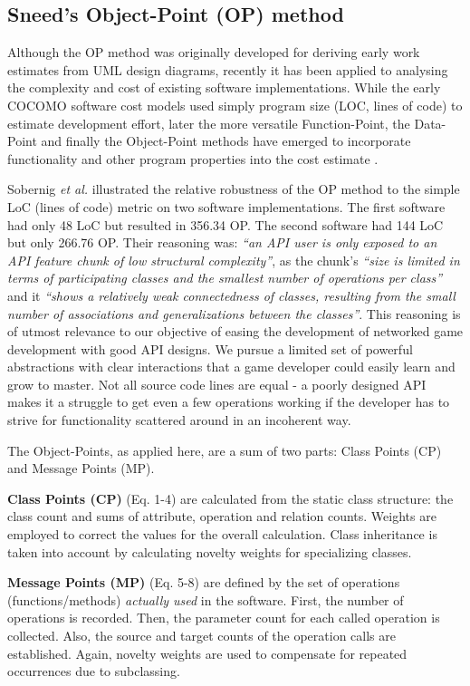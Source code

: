 \documentclass[conference]{IEEEtran}
\begin{document}
\subsection{Sneed's Object-Point (OP) method%
  \label{sneed-s-object-point-op-method}%
}

Although the OP method was originally developed for deriving early
work estimates from UML design diagrams, recently it has been applied
to analysing the complexity and cost of existing software
implementations. While the early COCOMO software cost models used
simply program size (LOC, lines of code) to estimate development
effort, later the more versatile Function-Point, the Data-Point and
finally the Object-Point methods have emerged to incorporate
functionality and other program properties into the cost estimate
\cite{henrich97repositorybased}.

Sobernig \emph{et al.} illustrated the relative robustness of the OP method
to the simple LoC (lines of code) metric on two software
implementations. The first software had only 48 LoC but resulted in
356.34 OP. The second software had 144 LoC but only 266.76 OP. Their
reasoning was: \emph{``an API user is only exposed to an API feature chunk
of low structural complexity''}, as the chunk's \emph{``size is limited in
terms of participating classes and the smallest number of operations
per class''} and it \emph{``shows a relatively weak connectedness of classes,
resulting from the small number of associations and generalizations
between the classes''}. This reasoning is of utmost relevance to our
objective of easing the development of networked game development with
good API designs. We pursue a limited set of powerful abstractions
with clear interactions that a game developer could easily learn and
grow to master. Not all source code lines are equal - a poorly
designed API makes it a struggle to get even a few operations working
if the developer has to strive for functionality scattered around in
an incoherent way.

The Object-Points, as applied here, are a sum of two parts: Class
Points (CP) and Message Points (MP).

\textbf{Class Points (CP)} (Eq. 1-4) are calculated from the static class structure: the
class count and sums of attribute, operation and relation
counts. Weights are employed to correct the values for the overall
calculation. Class inheritance is taken into account by calculating
novelty weights for specializing classes.

\textbf{Message Points (MP)} (Eq. 5-8) are defined by the set of operations
(functions/methods) \emph{actually used} in the software. First, the number
of operations is recorded. Then, the parameter count for each called
operation is collected. Also, the source and target counts of the
operation calls are established. Again, novelty weights are used to
compensate for repeated occurrences due to subclassing.
\end{document}
